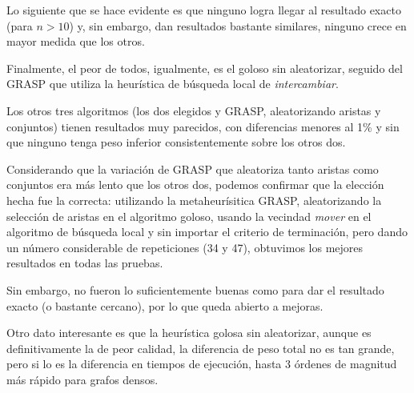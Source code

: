 Lo siguiente que se hace evidente es que ninguno logra llegar al resultado
exacto (para $n > 10$) y, sin embargo, dan resultados bastante similares,
ninguno crece en mayor medida que los otros.

Finalmente, el peor de todos, igualmente, es el goloso sin aleatorizar, seguido
del GRASP que utiliza la heurística de búsqueda local de \textit{intercambiar}.

Los otros tres algoritmos (los dos elegidos y GRASP, aleatorizando aristas y
conjuntos) tienen resultados muy parecidos, con diferencias menores al 1\% y
sin que ninguno tenga peso inferior consistentemente sobre los otros dos.

Considerando que la variación de GRASP que aleatoriza tanto aristas como
conjuntos era más lento que los otros dos, podemos confirmar que la elección
hecha fue la correcta: utilizando la metaheurísitica GRASP, aleatorizando la
selección de aristas en el algoritmo goloso, usando la vecindad \textit{mover}
en el algoritmo de búsqueda local y sin importar el criterio de terminación,
pero dando un número considerable de repeticiones (34 y 47), obtuvimos los
mejores resultados en todas las pruebas.

Sin embargo, no fueron lo suficientemente buenas como para dar el resultado
exacto (o bastante cercano), por lo que queda abierto a mejoras.

Otro dato interesante es que la heurística golosa sin aleatorizar, aunque es
definitivamente la de peor calidad, la diferencia de peso total no es tan grande,
pero si lo es la diferencia en tiempos de ejecución, hasta 3 órdenes de magnitud
más rápido para grafos densos.
